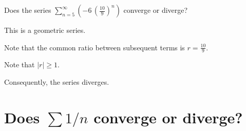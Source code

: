 \documentclass{ximera}
\begin{document}
\begin{question}
  Does the series \(\displaystyle\sum_{n=5}^\infty \left( -6 \, \left(\displaystyle\frac{10}{9}\right)^{n} \right)\) converge or diverge?

  \begin{solution}
    \begin{hint}
      This is a geometric series.
    \end{hint}
    \begin{hint}
      Note that the common ratio between subsequent terms is \(r = \displaystyle\frac{10}{9}\).
    \end{hint}
    \begin{hint}
      Note that \(|r| \geq 1\).
    \end{hint}
    \begin{hint}
      Consequently, the series diverges.
      
    \end{hint}
    

    \begin{multiple-choice}
    \end{multiple-choice}

  \end{solution}
\end{question}

\section{Does $\sum 1/n$ converge or diverge?}

\end{document}
